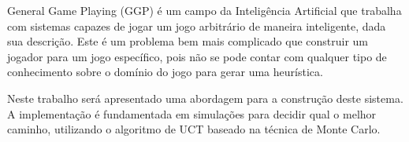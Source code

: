 General Game Playing (GGP) é um campo da Inteligência Artificial que trabalha com sistemas capazes de jogar um jogo arbitrário de maneira inteligente, dada sua descrição. Este é um problema bem mais complicado que construir um jogador para um jogo específico, pois não se pode contar com qualquer tipo de conhecimento sobre o domínio do jogo para gerar uma heurística.

Neste trabalho será apresentado uma abordagem para a construção deste sistema. A implementação é fundamentada em simulações para decidir qual o melhor caminho, utilizando o algoritmo de UCT baseado na técnica de Monte Carlo.